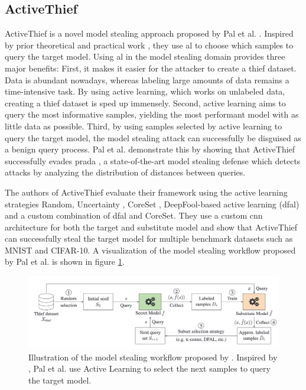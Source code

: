 \subsection{ActiveThief}
\label{sec:Related_work:Model_Stealing:ActiveThief}
ActiveThief is a novel model stealing approach proposed by Pal et al. \cite{pal2020activethief}. Inspired by prior theoretical \cite{chandrasekaran2020exploring}
and practical work \cite{shi2018active}, they use \gls{al} to choose which samples to query the target model. Using \gls{al} in the model stealing
domain provides three major benefits: First, it makes it easier for the attacker to create a thief dataset. Data is abundant nowadays, whereas labeling large amounts
of data remains a time-intensive task. By using active learning, which works on unlabeled data, creating a thief dataset is sped up immensely.
Second, active learning aims to query the most informative samples, yielding the most performant model with as little data as possible. Third, by using samples selected
by active learning to query the target model, the model stealing attack can successfully be disguised as a benign query process. Pal et al. demonstrate this by showing 
that ActiveThief successfully evades \gls{prada} \cite{juuti2019prada}, a state-of-the-art model stealing defense which detects attacks by analyzing the distribution of distances
between queries. \par
The authors of ActiveThief evaluate their framework using the active learning strategies Random, Uncertainty \cite{lewis1995sequential}, CoreSet \cite{sener2017active},
DeepFool-based active learning (\gls{dfal}) \cite{ducoffe2018adversarial} and a custom combination of \gls{dfal} and CoreSet. They use a custom \gls{cnn} architecture
for both the target and substitute model and show that ActiveThief can successfully steal the target model for multiple benchmark datasets such as MNIST and CIFAR-10.
A visualization of the model stealing workflow proposed by Pal et al. is shown in figure \ref{fig:ActiveThief}.

\begin{figure} [ht]
    \centering
    \includegraphics[width=.9\linewidth]{images/ActiveThief_Idea.png}
    \caption[Visualization of ActiveThief]{Illustration of the model stealing workflow proposed by \cite{pal2020activethief}. Inspired by
    \cite{chandrasekaran2020exploring}, Pal et al. use Active Learning to select the next samples to query the target model.}
    \label{fig:ActiveThief}
\end{figure}

